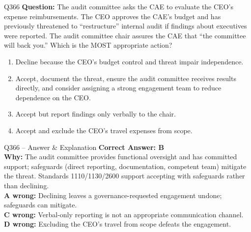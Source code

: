 \documentclass[aspectratio=169,10pt]{beamer}
\begin{document}
	\begin{frame}[t]{Q366}
		\small
		\textbf{Question:} The audit committee asks the CAE to evaluate the CEO's expense reimbursements. The CEO approves the CAE's budget and has previously threatened to ``restructure'' internal audit if findings about executives were reported. The audit committee chair assures the CAE that ``the committee will back you.'' Which is the MOST appropriate action?
		\begin{enumerate}[label=\Alph*.,itemsep=1pt,topsep=2pt]
			\item Decline because the CEO's budget control and threat impair independence.
			\item Accept, document the threat, ensure the audit committee receives results directly, and consider assigning a strong engagement team to reduce dependence on the CEO.
			\item Accept but report findings only verbally to the chair.
			\item Accept and exclude the CEO's travel expenses from scope.
		\end{enumerate}
	\end{frame}
	
	\begin{frame}[t]{Q366 -- Answer \& Explanation}
		\small
		\textbf{Correct Answer: B} \\[4pt]
		\textbf{Why:} The audit committee provides functional oversight and has committed support; safeguards (direct reporting, documentation, competent team) mitigate the threat. Standards 1110/1130/2600 support accepting with safeguards rather than declining. \\[4pt]
		\textbf{A wrong:} Declining leaves a governance-requested engagement undone; safeguards can mitigate. \\[2pt]
		\textbf{C wrong:} Verbal-only reporting is not an appropriate communication channel. \\[2pt]
		\textbf{D wrong:} Excluding the CEO's travel from scope defeats the engagement.
	\end{frame}
	
\end{document}

